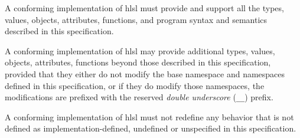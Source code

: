 
\p A conforming implementation of \acrshort{hlsl} must provide and support all
the types, values, objects, attributes, functions, and program syntax and
semantics described in this specification.

\p A conforming implementation of \acrshort{hlsl} may provide additional types,
values, objects, attributes, functions beyond those described in this
specification, provided that they either do not modify the base namespace and
namespaces defined in this specification, or if they do modify those namespaces,
the modifications are prefixed with the reserved \textit{double underscore}
(\texttt{__}) prefix.

\p A conforming implementation of \acrshort{hlsl} must not redefine any behavior
that is not defined as implementation-defined, undefined or unspecified in this
specification.
